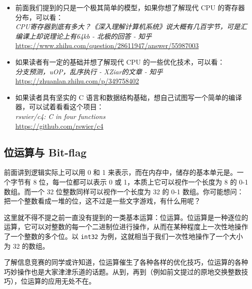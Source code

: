 \begin{tcolorbox}[myrecommendbox, title=推荐阅读, breakable=false]
    \begin{itemize}
        \item 前面我们提到的只是一个极其简单的模型，如果你想了解现代 CPU 的寄存器分布，可以看：\\
              \textit{CPU寄存器到底有多大？《深入理解计算机系统》说大概有几百字节，可是汇编课上却说理论上有64kb - 北极的回答 - 知乎}\\
              \url{https://www.zhihu.com/question/28611947/answer/55987003}
        \item 如果读者有一定的基础并想了解现代 CPU 的一些优化技术，可以看：\\
              \textit{分支预测，uOP，乱序执行 - XZiar的文章 - 知乎}\\
              \url{https://zhuanlan.zhihu.com/p/349758402}
        \item 如果读者具有坚实的 C 语言和数据结构基础，想自己试图写一个简单的编译器，可以试着看看这个项目：\\
              \textit{rswier/c4: C in four functions}\\
              \url{https://github.com/rswier/c4}
    \end{itemize}
\end{tcolorbox}

\newpage

\subsection{位运算与 Bit-flag}

前面讲到逻辑实际上可以用 0 和 1 来表示，而在内存中，储存的基本单元是。一个字节有 8 位，每一位都可以表示 0 或 1，本质上它可以视作一个长度为 8 的 0-1 数组。而一个 32 位整数同样可以视作一个长度为 32 的 0-1 数组。你可能想问：把一个整数看成一堆的位，这不过是一些文字游戏，有什么用呢？

这里就不得不提之前一直没有提到的一类基本运算：位运算。位运算是一种逐位的运算，它可以对整数的每一个二进制位进行操作，从而在某种程度上一次性地操作了一个整数的多个位。以 \texttt{int32} 为例，这就相当于我们一次性地操作了一个大小为 32 的数组。

了解信息竞赛的同学或许知道，位运算催生了各种各样的优化技巧，位运算的各种巧妙操作也是大家津津乐道的话题。从到，再到（例如前文提过的原地交换整数技巧），位运算的应用无处不在。


